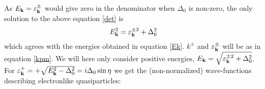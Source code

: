 \begin{comment}
    \\ &= 
    \det\begin{pmatrix}(\varepsilon^{\pm}_{k} -E_{k})\hat{\sigma}_0\end{pmatrix}
    \det\begin{pmatrix}
    -(\varepsilon^{\pm}_{k} + E_{k})\hat{\sigma}_0 + i\Delta^*\hat{\sigma}_2\frac{1}{\varepsilon^{\pm}_{k}-E_{k}}i\Delta\hat{\sigma}_2
    \end{pmatrix}
where we have used the relation 
\begin{equation}
\det\begin{pmatrix}
A & B \\ C & D
\end{pmatrix}
= \det\big(A\big)\det\big(D-CA^{-1}B\big).
\end{equation}
\end{comment}
As $E_{\mathbf{k}} = \varepsilon^{\pm}_{\mathbf{k}}$ would give zero in the denominator when $\Delta_0$ is non-zero, the only solution to the above equation \eqref{det} is
\begin{equation}
E_{\mathbf{k}}^2 = \varepsilon^{\pm2}_{\mathbf{k}} + \Delta_0^2
\end{equation}
which agrees with the energies obtained in equation \eqref{Ek}. $k^{\pm}$ and $\varepsilon^{\pm}_{\mathbf{k}}$ will be as in equation \eqref{kpm}. We will here only consider positive energies, $E_{\mathbf{k}}=\sqrt{\varepsilon^{\pm2}_{\mathbf{k}} + \Delta_0^2}$. For $\varepsilon^+_{\mathbf{k}} = +\sqrt{E_{\mathbf{k}}^2-\Delta_0^2} = i\Delta_0\sin\eta$ we get the (non-normalized) wave-functions describing electronlike quasiparticles:
\begin{comment}
We find the wave functions corresponding to the eigenvalue $+E_{k,S}$, by reducing the matrix
\begin{equation}
\begin{pmatrix}
\big(\varepsilon_{k,S} - E_{k,S}\big) \hat{\sigma}_0 & i\Delta\hat{\sigma}_2 \\
-i\Delta^*\hat{\sigma}_2 & -\big(\varepsilon_{k,S} + E_{k,S}\big)\hat{\sigma_0}  
\end{pmatrix}
\sim
\begin{pmatrix}
\hat{\sigma}_0 & -i\frac{u_0}{v_0}e^{i\gamma}\hat{\sigma}_2 \\
0 & 0
\end{pmatrix}
\end{equation}
which give the solutions
\end{comment}
